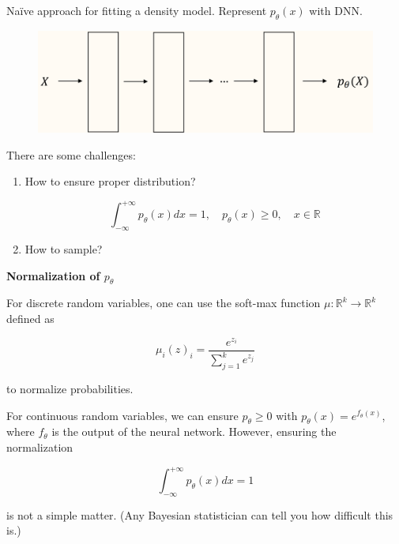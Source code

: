 \begin{concept}
    Naïve approach for fitting a density model. Represent $p_{\theta}(x)$ with DNN.

    \begin{figure}[H]
        \centering
        \includegraphics[width=1.0\textwidth]{.././assets/10.5.png}
    \end{figure}

    There are some challenges:

    \begin{enumerate}
        \item
        How to ensure proper distribution?

        $$
        \int_{-\infty}^{+\infty} p_{\theta}(x) d x=1, \quad p_{\theta}(x) \geq 0, \quad x \in \mathbb{R}
        $$
        \item How to sample?
    \end{enumerate}

    \par\noindent\textcolor{gray}{\hdashrule{\textwidth}{0.4pt}{1pt 2pt}}

    \textbf{Normalization of $p_{\theta}$}

    For discrete random variables, one can use the soft-max function $\mu: \mathbb{R}^{k} \rightarrow \mathbb{R}^{k}$ defined as

    $$
    \mu_{i}(z)_{i}=\frac{e^{z_{i}}}{\sum_{j=1}^{k} e^{z_{j}}}
    $$

    to normalize probabilities.

    For continuous random variables, we can ensure $p_{\theta} \geq 0$ with $p_{\theta}(x)=e^{f_{\theta}(x)}$, where $f_{\theta}$ is the output of the neural network. However, ensuring the normalization

    $$
    \int_{-\infty}^{+\infty} p_{\theta}(x) d x=1
    $$

    is not a simple matter. (Any Bayesian statistician can tell you how difficult this is.)

    \par\noindent\textcolor{gray}{\hdashrule{\textwidth}{0.4pt}{1pt 2pt}}


\end{concept}
